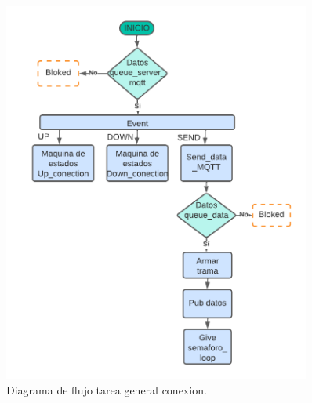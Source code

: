 \begin{figure}[htbp]
  \centering
	\includegraphics[width=0.9\textwidth]{./Figures/DF general task conection.png}
	\caption{Diagrama de flujo tarea general conexion.}
	\label{fig:Df tarea conexion}
\end{figure}

